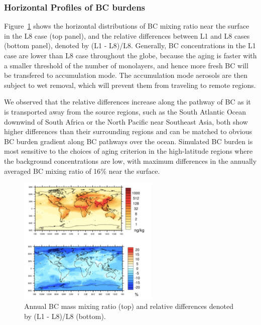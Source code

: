 \documentclass[12pt]{article}
\begin{document}
	\subsubsection{Horizontal Profiles of BC burdens}
	Figure~\ref{fig_P13} shows the horizontal distributions of BC mixing ratio near the surface in the L8 case (top panel), and the relative differences between L1 and L8 cases (bottom panel), denoted by (L1 - L8)/L8. Generally, BC concentrations in the L1 case are lower than L8 case throughout the globe, because the aging is faster with a smaller threshold of the number of monolayers, and hence more fresh BC will be transfered to accumulation mode. The accumulation mode aerosols are then subject to wet removal, which will prevent them from traveling to remote regions.     
	
	We observed that the relative differences increase along the pathway of BC as it is transported away from the source regions, such as the South Atlantic Ocean downwind of South Africa or the North Pacific near Southeast Asia, both show higher differences than their surrounding regions and can be matched to obvious BC burden gradient along BC pathways over the ocean. Simulated BC burden is most sensitive to the choices of aging criterion in the high-latitude regions where the background concentrations are low, with maximum differences in the annually averaged BC mixing ratio of 16$\%$ near the surface. 
	
	\begin{figure}[H] 
		\begin{center}
			\includegraphics[width = 0.6\textwidth]{Figure13}
			\caption[]{\label{fig_P13} Annual BC mass mixing ratio (top) and relative differences denoted by (L1 - L8)/L8 (bottom).}
		\end{center}
	\end{figure}
	
\end{document}
